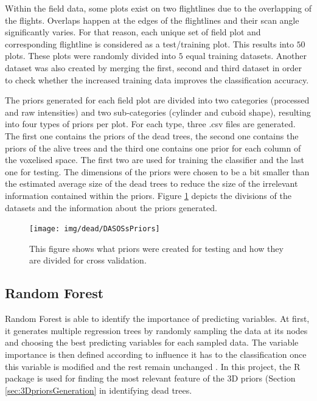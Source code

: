 \documentclass{subfiles}
\begin{document}
\par Within the field data, some plots exist on two flightlines due to the overlapping of the flights. Overlaps happen at the edges of the flightlines and their scan angle significantly varies. For that reason,  each unique set of field plot and corresponding flightline is considered as a test/training plot. This results into $50$ plots. These plots were randomly divided into $5$ equal training datasets. Another dataset was also created by merging the first, second and third dataset in order to check whether the increased training data improves the classification accuracy.

\par The priors generated for each field plot are divided into two categories (processed and raw intensities) and two sub-categories (cylinder and cuboid shape), resulting into four types of priors per plot. For each type, three .csv files are generated. The first one contains the priors of the dead trees, the second one contains the priors of the alive trees and the third one contains one prior for each column of the voxelised space. The first two are used for training the classifier and the last one for testing. The dimensions of the priors were chosen to be a bit smaller than the estimated average size of the dead trees to reduce the size of the irrelevant information contained within the priors. Figure \ref{fig:DASOSsPriors} depicts the divisions of the datasets and the information about the priors generated. 


\begin{figure} [h!]
	\centering
	\texttt{[image: img/dead/DASOSsPriors]}
	\caption{This figure shows what priors were created for testing and how they are divided for cross validation.}
	\label{fig:DASOSsPriors}
\end{figure}


	

	
\subsection{Random Forest}\label{sec:RandomForest}
	
	
	\par Random Forest is able to identify the importance of predicting variables. At first, it generates multiple regression trees by randomly sampling the data at its nodes and choosing the best predicting variables for each sampled data. The variable importance is then defined according to influence it has to the classification once this variable is modified and the rest remain unchanged \cite{Liaw2002}. In this project, the R package is used for finding the most relevant feature of the 3D priors (Section \ref{sec:3DpriorsGeneration} in identifying dead trees. 
\end{document}
